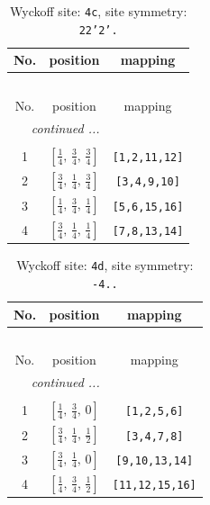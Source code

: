 \documentclass[fleqn,8pt]{jsarticle}
\begin{document}
\renewcommand{\arraystretch}{1.2}
\begin{longtable}{ccc}
\caption{Wyckoff site: {\tt 4c}, site symmetry: {\tt 22'2'.}}
 \\
 \hline \hline
No. & position & mapping \\ \hline \endfirsthead

\multicolumn{2}{l}{\tablename\ \thetable{}} \\
 \hline \hline
No. & position & mapping \\ \hline \endhead

 \hline \hline
\multicolumn{2}{r}{\footnotesize\it continued ...} \\ \endfoot

 \hline \hline
\multicolumn{2}{r}{} \\ \endlastfoot

1 & $\left[ \frac{1}{4},\, \frac{3}{4},\, \frac{3}{4} \right]$ & {\tt [1,2,11,12]} \\ \hline
2 & $\left[ \frac{3}{4},\, \frac{1}{4},\, \frac{3}{4} \right]$ & {\tt [3,4,9,10]} \\ \hline
3 & $\left[ \frac{1}{4},\, \frac{3}{4},\, \frac{1}{4} \right]$ & {\tt [5,6,15,16]} \\ \hline
4 & $\left[ \frac{3}{4},\, \frac{1}{4},\, \frac{1}{4} \right]$ & {\tt [7,8,13,14]} \\
\end{longtable}
\renewcommand{\arraystretch}{1.2}
\begin{longtable}{ccc}
\caption{Wyckoff site: {\tt 4d}, site symmetry: {\tt -4..}}
 \\
 \hline \hline
No. & position & mapping \\ \hline \endfirsthead

\multicolumn{2}{l}{\tablename\ \thetable{}} \\
 \hline \hline
No. & position & mapping \\ \hline \endhead

 \hline \hline
\multicolumn{2}{r}{\footnotesize\it continued ...} \\ \endfoot

 \hline \hline
\multicolumn{2}{r}{} \\ \endlastfoot

1 & $\left[ \frac{1}{4},\, \frac{3}{4},\, 0 \right]$ & {\tt [1,2,5,6]} \\ \hline
2 & $\left[ \frac{3}{4},\, \frac{1}{4},\, \frac{1}{2} \right]$ & {\tt [3,4,7,8]} \\ \hline
3 & $\left[ \frac{3}{4},\, \frac{1}{4},\, 0 \right]$ & {\tt [9,10,13,14]} \\ \hline
4 & $\left[ \frac{1}{4},\, \frac{3}{4},\, \frac{1}{2} \right]$ & {\tt [11,12,15,16]} \\
\end{longtable}
\end{document}
